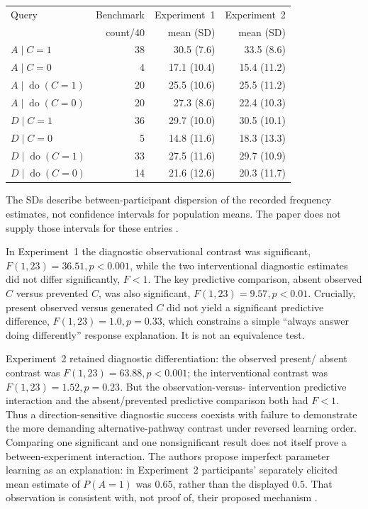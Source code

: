\begin{center}
\small
\begin{tabular}{lrrr}
\hline
Query & Benchmark & Experiment~1 & Experiment~2\\
 & count/40 & mean (SD) & mean (SD)\\
\hline
\(A\mid C=1\) &38&30.5 (7.6)&33.5 (8.6)\\
\(A\mid C=0\) &4&17.1 (10.4)&15.4 (11.2)\\
\(A\mid\operatorname{do}(C=1)\)&20&25.5 (10.6)&25.5 (11.2)\\
\(A\mid\operatorname{do}(C=0)\)&20&27.3 (8.6)&22.4 (10.3)\\
\(D\mid C=1\)&36&29.7 (10.0)&30.5 (10.1)\\
\(D\mid C=0\)&5&14.8 (11.6)&18.3 (13.3)\\
\(D\mid\operatorname{do}(C=1)\)&33&27.5 (11.6)&29.7 (10.9)\\
\(D\mid\operatorname{do}(C=0)\)&14&21.6 (12.6)&20.3 (11.7)\\
\hline
\end{tabular}
\end{center}
The SDs describe between-participant dispersion of the recorded frequency
estimates, not confidence intervals for population means. The paper
does not supply those intervals for these entries
\cite[Table~2, p.~77]{MederHagmayerWaldmann2008Interventional}.

In Experiment~1 the diagnostic observational contrast was significant,
\(F(1,23)=36.51,p<0.001\), while the two interventional diagnostic
estimates did not differ significantly, \(F<1\). The key predictive
comparison, absent observed \(C\) versus prevented \(C\), was also
significant, \(F(1,23)=9.57,p<0.01\). Crucially, present observed
versus generated \(C\) did not yield a significant predictive
difference, \(F(1,23)=1.0,p=0.33\), which constrains a simple
``always answer doing differently'' response explanation. It is not
an equivalence test.

Experiment~2 retained diagnostic differentiation: the observed present/
absent contrast was \(F(1,23)=63.88,p<0.001\); the interventional
contrast was \(F(1,23)=1.52,p=0.23\). But the observation-versus-
intervention predictive interaction and the absent/prevented predictive
comparison both had \(F<1\). Thus a direction-sensitive diagnostic
success coexists with failure to demonstrate the more demanding
alternative-pathway contrast under reversed learning order. Comparing
one significant and one nonsignificant result does not itself prove a
between-experiment interaction. The authors propose imperfect parameter
learning as an explanation: in Experiment~2 participants' separately
elicited mean estimate of \(P(A=1)\) was \(0.65\), rather than the
displayed \(0.5\). That observation is consistent with, not proof of,
their proposed mechanism
\cite[pp.~77--79]{MederHagmayerWaldmann2008Interventional}.

